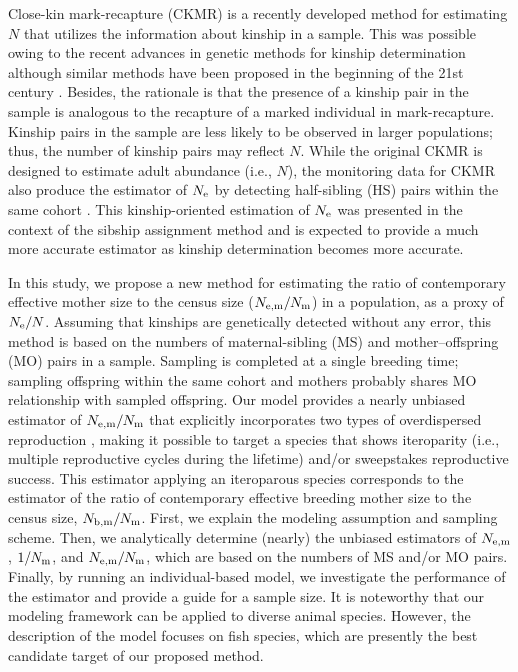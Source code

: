 \documentclass[12pt, English]{article}
\begin{document}
\begin{spacing}{1.9}
Close-kin mark-recapture (CKMR) is a recently developed method for estimating $N$ that utilizes the information about kinship in a sample. This was possible owing to the recent advances in genetic methods for kinship determination \cite[]{Bravington_2016,bravington2016close,skaug2017parent,Hillary_2018} although similar methods have been proposed in the beginning of the 21st century \cite[]{nielsen2001statistical, pearse2001genetic, julius2001allele}. Besides, the rationale is that the presence of a kinship pair in the sample is analogous to the recapture of a marked individual in mark-recapture. Kinship pairs in the sample are less likely to be observed in larger populations; thus, the number of kinship pairs may reflect $N$. While the original CKMR is designed to estimate adult abundance (i.e., $N$), the monitoring data for CKMR also produce the estimator of $N_{\rm e}$ by detecting half-sibling (HS) pairs within the same cohort \cite[]{Akita_2019}. This kinship-oriented estimation of $N_{\rm e}$ was presented in the context of the sibship assignment method \cite[]{wang2009new} and is expected to provide a much more accurate estimator as kinship determination becomes more accurate. 

In this study, we propose a new method for estimating the ratio of contemporary effective mother size to the census size ($N_{\rm e,m}/N_{\rm m}$) in a population, as a proxy of $N_{\rm e}/N$. Assuming that kinships are genetically detected without any error, this method is based on the numbers of maternal-sibling (MS) and mother--offspring (MO) pairs in a sample. Sampling is completed at a single breeding time; sampling offspring within the same cohort and mothers probably shares MO relationship with sampled offspring. Our model provides a nearly unbiased estimator of $N_{\rm e,m}/N_{\rm m}$ that explicitly incorporates two types of overdispersed reproduction \cite[i.e., parental and nonparental variations;][]{Akita_2019}, making it possible to target a species that shows iteroparity (i.e., multiple reproductive cycles during the lifetime) and/or sweepstakes reproductive success. This estimator applying an iteroparous species corresponds to the estimator of the ratio of contemporary effective breeding mother size to the census size, $N_{\rm b,m}/N_{\rm m}$. First, we explain the modeling assumption and sampling scheme. Then, we analytically determine (nearly) the unbiased estimators of $N_{\rm e,m}$, $ 1/N_{\rm m}$, and $N_{\rm e,m}/N_{\rm m}$, which are based on the numbers of MS and/or MO pairs. Finally, by running an individual-based model, we investigate the performance of the estimator and provide a guide for a sample size. It is noteworthy that our modeling framework can be applied to diverse animal species. However, the description of the model focuses on fish species, which are presently the best candidate target of our proposed method. 


\end{spacing}
\end{document}

